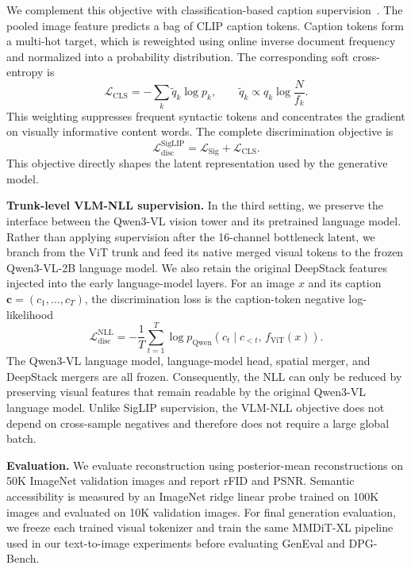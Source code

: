 We complement this objective with classification-based caption supervision~\cite{huang2024classification}.
The pooled image feature predicts a bag of CLIP caption tokens. 
Caption tokens form a multi-hot target, which is reweighted using online inverse document frequency and normalized into a probability distribution. 
The corresponding soft cross-entropy is
\begin{equation}
    \mathcal{L}_{\mathrm{CLS}}
    =
    -\sum_{k}
    \widetilde{q}_{k}
    \log p_{k},
    \qquad
    \widetilde{q}_{k}
    \propto
    q_k\log\frac{N}{f_k}.
\end{equation}
This weighting suppresses frequent syntactic tokens and concentrates the gradient on visually informative content words. 
The complete discrimination objective is
\begin{equation}
    \mathcal{L}_{\mathrm{disc}}^{\mathrm{SigLIP}}
    =
    \mathcal{L}_{\mathrm{Sig}}
    + \mathcal{L}_{\mathrm{CLS}}.
\end{equation}
This objective directly shapes the latent representation used by the generative model.

\textbf{Trunk-level VLM-NLL supervision.}
In the third setting, we preserve the interface between the Qwen3-VL vision tower and its pretrained language model. 
Rather than applying supervision after the 16-channel bottleneck latent, we branch from the ViT trunk and feed its native merged visual tokens to the frozen Qwen3-VL-2B language model. 
We also retain the original DeepStack features injected into the early language-model layers.
For an image \(x\) and its caption \(\mathbf{c}=(c_1,\ldots,c_T)\), the discrimination loss is the caption-token negative log-likelihood
\begin{equation}
    \mathcal{L}_{\mathrm{disc}}^{\mathrm{NLL}}
    =
    -\frac{1}{T}
    \sum_{t=1}^{T}
    \log p_{\mathrm{Qwen}}
    \left(
        c_t
        \mid c_{<t},\,f_{\mathrm{ViT}}(x)
    \right).
\end{equation}
The Qwen3-VL language model, language-model head, spatial merger, and DeepStack mergers are all frozen. 
Consequently, the NLL can only be reduced by preserving visual features that remain readable by the original Qwen3-VL language model. 
Unlike SigLIP supervision, the VLM-NLL objective does not depend on cross-sample negatives and therefore does not require a large global batch.

\textbf{Evaluation.}
We evaluate reconstruction using posterior-mean reconstructions on 50K
ImageNet validation images and report rFID and PSNR. Semantic accessibility is
measured by an ImageNet ridge linear probe trained on 100K images and evaluated
on 10K validation images. 
For final generation evaluation, we freeze each trained visual tokenizer and train the same MMDiT-XL pipeline used in our text-to-image experiments before evaluating GenEval and DPG-Bench.

